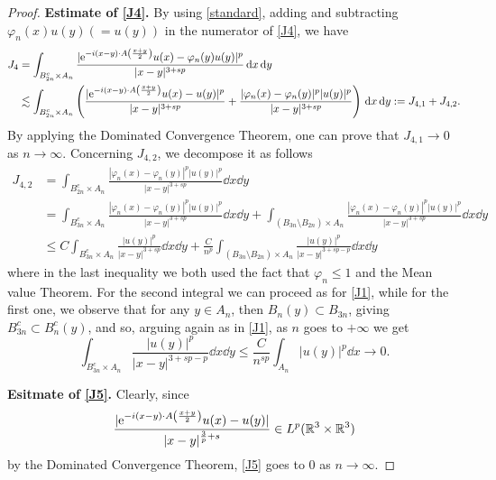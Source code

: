 \documentclass[leqno,11pt]{amsart}
\newcommand{\R}{\mathbb R}
\numberwithin{equation}{section}
\def\e{{\rm e}}
\newcommand{\expAminus}{\e^{-i(x-y)\cdot A\left(\frac{x+y}{2}\right)}}
\begin{document}
\begin{proof}
    
    
{\bf Estimate of \eqref{J4}.}  
By using \eqref{standard}, adding and subtracting $\varphi_n(x)u(y)(=u(y))$ in the numerator of \eqref{J4}, we have
\begin{equation}\begin{aligned}
    J_4&=\int_{B_{2n}^c \times A_n}\frac{|\expAminus u(x)-\varphi_n(y)u(y)|^p}{|x-y|^{3+sp}}\dd x \dd y\\
    &\lesssim\int_{B_{2n}^c \times A_n}\left(\frac{|\expAminus u(x)- u(y)|^p}{|x-y|^{3+sp}}+\frac{|\varphi_n(x)-\varphi_n(y)|^p|u(y)|^p}{|x-y|^{3+sp}}\right)\dd x \dd y:=J_{4,1}+J_{4,2}.
\end{aligned}\end{equation}
By applying the Dominated Convergence Theorem, one can prove that $J_{4,1}\to 0$ as $n\to\infty$. Concerning $J_{4,2}$, we decompose it as follows
\begin{equation}\begin{aligned}
J_{4,2}&=\int_{B_{2n}^c \times A_n}\frac{|\varphi_n(x)-\varphi_n(y)|^p|u(y)|^p}{|x-y|^{3+sp}}\dd x \dd y\\
&=\int_{ B_{3n}^c\times A_n}\frac{|\varphi_n(x)-\varphi_n(y)|^p|u(y)|^p}{|x-y|^{3+sp}}\dd x \dd y+\int_{  (B_{3n}\setminus B_{2n})\times A_n}\frac{|\varphi_n(x)-\varphi_n(y)|^p|u(y)|^p}{|x-y|^{3+sp}}\dd x \dd y\\
&\le C\int_{ B_{3n}^c\times A_n}\frac{|u(y)|^p}{|x-y|^{3+sp}}\dd x \dd y+\frac{C}{n^p}\int_{  (B_{3n}\setminus B_{2n})\times A_n}\frac{|u(y)|^p}{|x-y|^{3+sp-p}}\dd x \dd y
\end{aligned}\end{equation}
where in the last inequality we both used the fact that $\varphi_n\le 1$ and the Mean value Theorem. For the second integral we can proceed as for \eqref{J1}, while for the first one, we observe that for any $y\in A_n$, then $B_n(y)\subset B_{3n}$, giving $B_{3n}^c\subset B_{n}^c(y)$, and so, arguing again as in \eqref{J1}, as $n$ goes to $+\infty$ we get
$$\int_{ B_{3n}^c\times A_n}\frac{|u(y)|^p}{|x-y|^{3+sp-p}}\dd x \dd y
\leq
\frac{C}{n^{sp}}\int_{A_n}|u(y)|^p \dd x \to 0.$$




{\bf Esitmate of \eqref{J5}.}
Clearly, since
\begin{equation}
    \frac{|\expAminus u(x) - u(y)|}{|x-y|^{\frac3p+s}} \in L^p(\R^3 \times \R^3) 
\end{equation}
by the Dominated Convergence Theorem, \eqref{J5} goes to $0$ as $n\to\infty$.
\end{proof}
\end{document}

